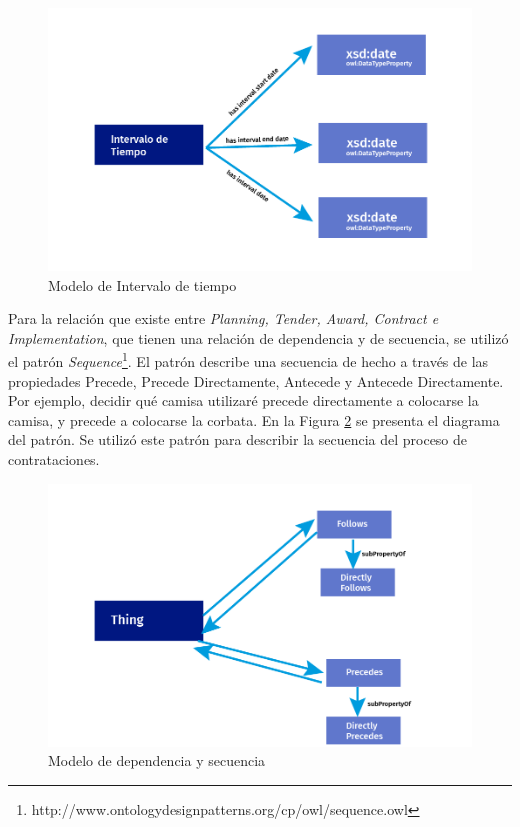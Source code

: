 \begin{figure}[ht!]
    \centering
    \includegraphics[width=150mm]{figuras/Diagramas_Tiempo.png}
    \caption{Modelo de Intervalo de tiempo}
    \label{img:Modelo de Intervalo de precio}
    
\end{figure}

Para la relación que existe entre \textit{Planning, Tender, Award, Contract e Implementation}, que tienen una relación de dependencia y de secuencia, se utilizó el patrón \textit{Sequence}\footnote{http://www.ontologydesignpatterns.org/cp/owl/sequence.owl}. El patrón describe una secuencia de hecho a través de las propiedades Precede, Precede Directamente, Antecede y Antecede Directamente. Por ejemplo, decidir qué camisa utilizaré precede directamente a colocarse la camisa, y precede a colocarse la corbata. En la Figura \ref{img:Modelo de dependencia y secuencia} se presenta el diagrama del patrón. Se utilizó este patrón para describir la secuencia del proceso de contrataciones.

\begin{figure}[ht!]
    \centering
    \includegraphics[width=150mm]{figuras/Diagramas_Follows.png}
    \caption{Modelo de dependencia y secuencia}
    \label{img:Modelo de dependencia y secuencia}
    
\end{figure}

